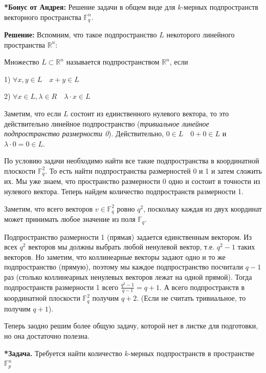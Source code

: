 \documentclass[]{book}
\theoremstyle{definition}
\newcommand{\bb}[1]{\mathbb{#1}}
\begin{document}
\begin{enumerate}[resume]
\textbf{*Бонус от Андрея:} Решение задачи в общем виде для $k$-мерных подпространств векторного пространства $\bb{F}^n_q$.


\textbf{Решение:}
Вспомним, что такое подпространство $L$ некоторого линейного пространства $\bb{R}^n$:

Множество $L \subset \bb{R}^n$ называется подпространством $\bb{R}^n$, если

1) $\forall x, y \in L \quad x + y \in L$

2) $\forall x \in L, \lambda \in R \quad \lambda\cdot x \in L$

Заметим, что если $L$ состоит из единственного нулевого вектора, то это действительно линейное подпространство (\textit{тривиальное линейное подпространство размерности 0}). Действительно, $0 \in L \quad 0 + 0 \in L$ и $\lambda\cdot 0 = 0 \in L$.

По условию задачи необходимо найти все такие подпространства в координатной плоскости $\bb{F}^2_q$. То есть найти подпространства размерностей 0 и 1 и затем сложить их.
Мы уже знаем, что пространство размерности 0 одно и состоит в точности из нулевого вектора. Теперь найдем количество подпространств размерности 1.

Заметим, что всего векторов $v \in \bb{F}^2_q$ ровно $q^2$, поскольку каждая из двух координат может принимать любое значение из поля $\bb{F}_q$. 

Подпространство размерности 1 (прямая) задается единственным вектором. Из всех $q^2$ векторов мы должны выбрать любой ненулевой вектор, т.е. $q^2 - 1$ таких векторов. Но заметим, что коллинеарные векторы задают одно и то же подпространство (прямую), поэтому мы каждое подпространство посчитали $q - 1$ раз (столько коллинеарных ненулевых векторов лежат на одной прямой). Тогда подпространств размерности 1 всего $\frac{q^2 - 1}{q - 1} = q + 1$. А всего подпространств в координатной плоскости $\bb{F}^2_q$ получим $q + 2$. (Если не считать тривиальное, то получим $q + 1$). 

Теперь заодно решим более общую задачу, которой нет в листке для подготовки, но она достаточно полезна.


\textbf{*Задача.}
Требуется найти количество $k$-мерных подпространств в пространстве $\bb{F}^n_p$


\end{enumerate}
\end{document}
